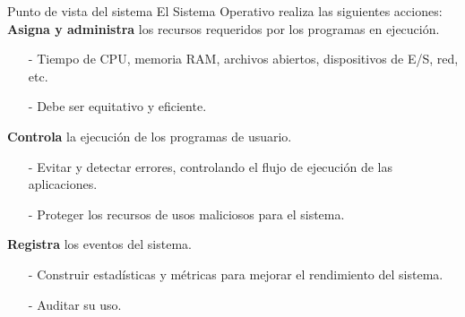 \documentclass[aspectratio=169]{beamer}
\begin{document}
\begin{frame}{Punto de vista del sistema}
    El Sistema Operativo realiza las siguientes acciones:\\
    \bigskip
    \small
    \textcolor{verdeuca}{\textbf{Asigna y administra}} los recursos requeridos por los programas en ejecución.
    \begin{itemize}
    \setlength\itemsep{-0.1cm}
    \item[-] Tiempo de CPU, memoria RAM, archivos abiertos, dispositivos de E/S, red, etc.
    \item[-] Debe ser equitativo y eficiente.
    \end{itemize}
    \medskip \pause
    \textcolor{verdeuca}{\textbf{Controla}} la ejecución de los programas de usuario.
    \begin{itemize}
    \setlength\itemsep{-0.1cm}
    \item[-] Evitar y detectar errores, controlando el flujo de ejecución de las aplicaciones.
    \item[-] Proteger los recursos de usos maliciosos para el sistema.
    \end{itemize}
    \medskip \pause
    \textcolor{verdeuca}{\textbf{Registra}} los eventos del sistema.
    \begin{itemize}
    \setlength\itemsep{-0.1cm}
    \item[-] Construir estadísticas y métricas para mejorar el rendimiento del sistema.
    \item[-] Auditar su uso.
    \end{itemize}
\end{frame}
\end{document}
